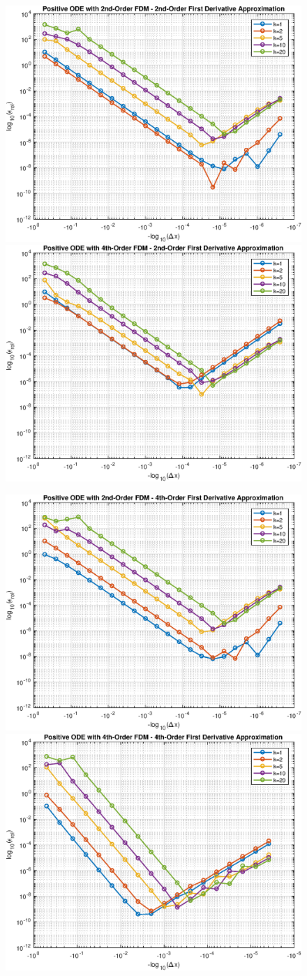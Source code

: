 \documentclass[10pt, reqno]{article}		%
\numberwithin{equation}{section}
\begin{document}
\begin{figure}[H]
	\begin{center}
		\includegraphics[width=0.46\linewidth]{positive_ode_order_2_fd_order_2}
		\includegraphics[width=0.46\linewidth]{positive_ode_order_4_fd_order_2}
	\end{center}
\end{figure}

\begin{figure}[H]
	\begin{center}
		\includegraphics[width=0.46\linewidth]{positive_ode_order_2_fd_order_4}
		\includegraphics[width=0.46\linewidth]{positive_ode_order_4_fd_order_4}
	\end{center}
\end{figure}
\end{document}
